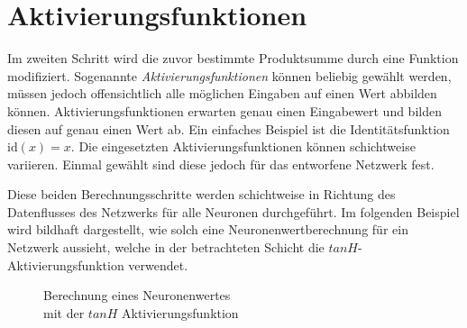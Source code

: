 \section{Aktivierungsfunktionen}\label{sec:activation}

Im zweiten Schritt wird die zuvor bestimmte Produktsumme durch eine Funktion
modifiziert. Sogenannte \emph{Aktivierungsfunktionen} können beliebig gewählt
werden, müssen jedoch offensichtlich alle möglichen Eingaben auf einen Wert
abbilden können. Aktivierungsfunktionen erwarten genau einen Eingabewert
und bilden diesen auf genau einen Wert ab. Ein einfaches Beispiel ist die
Identitätsfunktion $\text{id}(x) = x$. Die eingesetzten Aktivierungsfunktionen
können schichtweise variieren. Einmal gewählt sind diese jedoch für das
entworfene Netzwerk fest.

Diese beiden Berechnungsschritte werden schichtweise in Richtung des
Datenflusses des Netzwerks für alle Neuronen durchgeführt. Im folgenden
Beispiel wird bildhaft dargestellt, wie solch eine Neuronenwertberechnung für
ein Netzwerk aussieht, welche in der betrachteten Schicht die
$tanH$-Aktivierungsfunktion verwendet.\bigskip

\begin{figure}
    \centering
    \caption{Berechnung eines Neuronenwertes\\mit der $tanH$ Aktivierungsfunktion}
\end{figure}

